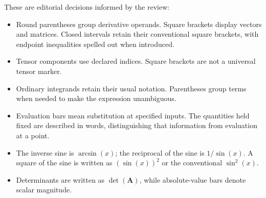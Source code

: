 \documentclass[11pt,oneside,openany]{book}
\begin{document}
These are editorial decisions informed by the review:

\begin{itemize}
\item Round parentheses group derivative operands. Square brackets display vectors and matrices. Closed intervals retain their conventional square brackets, with endpoint inequalities spelled out when introduced.
\item Tensor components use declared indices. Square brackets are not a universal tensor marker.
\item Ordinary integrands retain their usual notation. Parentheses group terms when needed to make the expression unambiguous.
\item Evaluation bars mean substitution at specified inputs. The quantities held fixed are described in words, distinguishing that information from evaluation at a point.
\item The inverse sine is \(\arcsin(x)\); the reciprocal of the sine is \(1/\sin(x)\). A square of the sine is written as \((\sin(x))^2\) or the conventional \(\sin^2(x)\).
\item Determinants are written as \(\det(\mathbf A)\), while absolute-value bars denote scalar magnitude.

\end{itemize}
\end{document}
